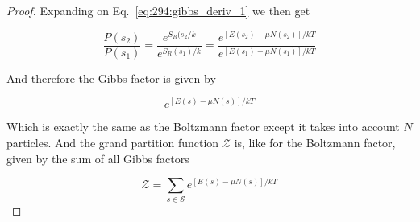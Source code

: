 \documentclass[10pt]{article}
\begin{document}
\begin{theorem}
\begin{proof}
		Expanding on Eq.~\ref{eq:294:gibbs_deriv_1} we then get 


		\begin{equation}
			\frac{P(s_2)}{P(s_1)} = 
			\frac{e^{{S_R(s_2} /k}}{e^{S_R(s_1) /k}} = \frac{e^{\left[ E(s_2) - \mu N(s_2) \right]/kT }}{e^{\left[ E(s_1) - \mu N(s_1) \right]/kT }}
		\end{equation}

		And therefore the Gibbs factor is given by

		\begin{equation}
		e^{\left[ E(s) - \mu N(s) \right]/kT }
		\end{equation}

		Which is exactly the same as the Boltzmann factor except it takes into account $ N $ particles.
		And the grand partition function $ \mathcal{Z} $ is, like for the Boltzmann factor, given by the sum of all Gibbs factors

		\begin{equation}
			\mathcal{Z} = \sum_{s \in \mathcal{S}} e^{\left[ E(s) - \mu N(s) \right]/kT }
		\end{equation}
		
	\end{proof}
	
\end{theorem}
\end{document}
